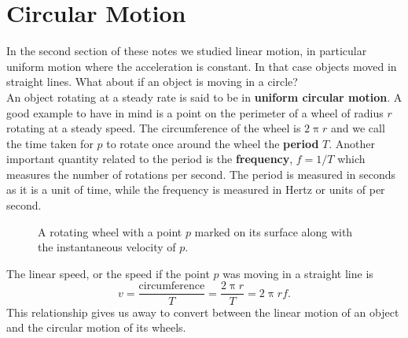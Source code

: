 \documentclass[a4paper,12pt]{book}
\begin{document}
\section{Circular Motion}
In the second section of these notes we studied linear motion, in particular uniform motion where the acceleration is constant. In that case objects moved in straight lines. What about if an object is moving in a circle?\\

An object rotating at a steady rate is said to be in \textbf{uniform circular motion}. A good example to have in mind is a point on the perimeter of a wheel of radius $r$ rotating at a steady speed. The circumference of the wheel is $2\uppi r$ and we call the time taken for $p$ to rotate once around the wheel the \textbf{period} $T$. Another important quantity related to the period is the \textbf{frequency}, $f=1/T$ which measures the number of rotations per second. The period is measured in seconds as it is a unit of time, while the frequency is measured in Hertz or units of per second.\\

\begin{figure}[ht]
    \centering
    \caption{A rotating wheel with a point $p$ marked on its surface along with the instantaneous velocity of $p$.}
        \label{fig: pt on a wheel}
\end{figure}

The linear speed, or the speed if the point $p$ was moving in a straight line is 
\begin{equation*}
v=\frac{\text{circumference}}{T}=\frac{2\uppi r}{T}=2\uppi r f.
\end{equation*}
This relationship gives us away to convert between the linear motion of an object and the circular motion of its wheels.
\end{document}
